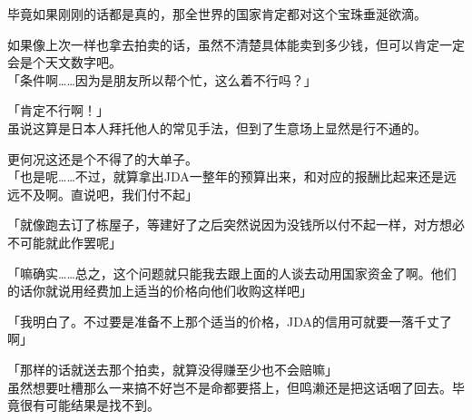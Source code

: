 毕竟如果刚刚的话都是真的，那全世界的国家肯定都对这个宝珠垂涎欲滴。

如果像上次一样也拿去拍卖的话，虽然不清楚具体能卖到多少钱，但可以肯定一定会是个天文数字吧。\\

「条件啊……因为是朋友所以帮个忙，这么着不行吗？」

「肯定不行啊！」\\

虽说这算是日本人拜托他人的常见手法，但到了生意场上显然是行不通的。

更何况这还是个不得了的大单子。\\

「也是呢……不过，就算拿出JDA一整年的预算出来，和对应的报酬比起来还是远远不及啊。直说吧，我们付不起」

「就像跑去订了栋屋子，等建好了之后突然说因为没钱所以付不起一样，对方想必不可能就此作罢呢」

「嘛确实……总之，这个问题就只能我去跟上面的人谈去动用国家资金了啊。他们的话你就说用经费加上适当的价格向他们收购这样吧」

「我明白了。不过要是准备不上那个适当的价格，JDA的信用可就要一落千丈了啊」

「那样的话就送去那个拍卖，就算没得赚至少也不会赔嘛」\\

虽然想要吐槽那么一来搞不好岂不是命都要搭上，但鸣濑还是把这话咽了回去。毕竟很有可能结果是找不到。\\

